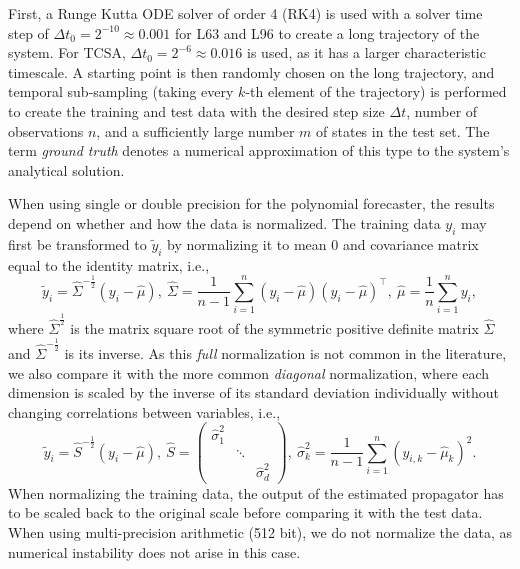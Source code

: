 \documentclass{article}
\newcommand{\lb}{\left(} %
\newcommand{\rb}{\right)} %
\newcommand{\br}[1]{\lb #1 \rb} %
\newcommand{\tr}{^{\!\top}\!} %
\newcommand{\stepsize}{\Delta\!t}
\begin{document}
First, a Runge Kutta ODE solver of order 4 (RK4) is used with a solver time step of $\stepsize_0 = 2^{-10} \approx 0.001$ for L63 and L96 to create a long trajectory of the system. For TCSA, $\stepsize_0 = 2^{-6} \approx 0.016$ is used, as it has a larger characteristic timescale. A starting point is then randomly chosen on the long trajectory, and temporal sub-sampling (taking every $k$-th element of the trajectory) is performed to create the training and test data with the desired step size $\stepsize$, number of observations $n$, and a sufficiently large number $m$ of states in the test set. The term \textit{ground truth} denotes a numerical approximation of this type to the system's analytical solution.

When using single or double precision for the polynomial forecaster, the results depend on whether and how the data is normalized. The training data $y_i$ may first be transformed to $\tilde y_i$ by normalizing it to mean $0$ and covariance matrix equal to the identity matrix, i.e., 
\begin{equation}
    \tilde y_i = \hat\Sigma^{-\frac12}(y_i - \hat\mu)
    ,\ 
    \hat\Sigma = \frac1{n\!-\!1}\sum_{i=1}^n(y_i - \hat\mu)(y_i - \hat\mu)\tr
    ,\ 
    \hat\mu = \frac1n\sum_{i=1}^ny_i
    ,
\end{equation}
where $\hat\Sigma^{\frac12}$ is the matrix square root of the symmetric positive definite matrix $\hat\Sigma$ and $\hat\Sigma^{-\frac12}$ is its inverse.
As this \textit{full} normalization is not common in the literature, we also compare it with the more common \textit{diagonal} normalization, where each dimension is scaled by the inverse of its standard deviation individually without changing correlations between variables, i.e.,
\begin{equation}
    \tilde y_i = \hat S^{-\frac12}(y_i - \hat\mu)
    ,\ 
    \hat S = \begin{pmatrix}
        \hat\sigma_1^2 &&\\
        &\ddots&\\
        &&\hat\sigma_d^2
    \end{pmatrix}
    ,\ 
    \hat \sigma_k^2 = \frac{1}{n\!-\!1}\sum_{i=1}^n \br{y_{i,k} - \hat\mu_k}^2
    .
\end{equation}
When normalizing the training data, the output of the estimated propagator has to be scaled back to the original scale before comparing it with the test data. When using multi-precision arithmetic (512 bit), we do not normalize the data, as numerical instability does not arise in this case.
\end{document}
